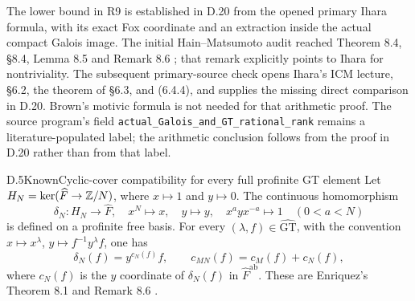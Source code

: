 The lower bound in R9 is established in D.20 from the opened primary
Ihara formula, with its exact Fox coordinate and an extraction inside
the actual compact Galois image. The initial Hain--Matsumoto audit
reached Theorem 8.4, \S8.4, Lemma 8.5 and Remark 8.6
\cite{DE_HainMatsumoto2003}; that remark explicitly points to Ihara
for nontriviality. The subsequent primary-source check opens Ihara's
ICM lecture, \S6.2, the theorem of \S6.3, and (6.4.4), and supplies
the missing direct comparison in D.20. Brown's motivic formula
\cite[(1.3)]{DE_Brown2015} is not needed for that arithmetic proof.
The source program's field
\texttt{actual\_Galois\_and\_GT\_rational\_rank} remains a
literature-populated label; the arithmetic conclusion follows from
the proof in D.20 rather than from that label.

\begin{statement}{D.5}{Known}{Cyclic-cover compatibility for every full profinite GT element}
Let $H_N=\ker(\widehat F\to\mathbb Z/N)$, where $x\mapsto1$ and $y\mapsto0$.
The continuous homomorphism
\[
 \delta_N:H_N\longrightarrow\widehat F,
 \quad x^N\mapsto x,\quad y\mapsto y,\quad
 x^ayx^{-a}\mapsto1\quad(0<a<N)
\]
is defined on a profinite free basis. For every
$(\lambda,f)\in\widehat{\mathrm{GT}}$, with the convention
$x\mapsto x^\lambda$, $y\mapsto f^{-1}y^\lambda f$, one has
\[
 \delta_N(f)=y^{c_N(f)}f,\qquad
 c_{MN}(f)=c_M(f)+c_N(f),
\]
where $c_N(f)$ is the $y$ coordinate of $\delta_N(f)$ in
$\widehat F^{\mathrm{ab}}$. These are Enriquez's Theorem 8.1 and
Remark 8.6 \cite{DE_Enriquez2007}.
\end{statement}
